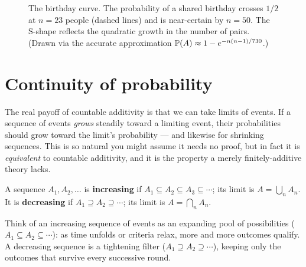\begin{figure}[H]
\centering
{}
\caption{The birthday curve. The probability of a shared birthday crosses $1/2$
at $n=23$ people (dashed lines) and is near-certain by $n=50$. The S-shape
reflects the quadratic growth in the number of pairs. (Drawn via the accurate
approximation $\P(A)\approx 1-e^{-n(n-1)/730}$.)}
\label{ch03:fig-birthday}
\end{figure}

\section{Continuity of probability}
\label{ch03:continuity}

The real payoff of countable additivity is that we can take limits of events. If a sequence of events \emph{grows} steadily toward
a limiting event, their probabilities should grow toward the limit's probability
--- and likewise for shrinking sequences. This is so natural you might assume it
needs no proof, but in fact it is \emph{equivalent} to countable additivity, and
it is the property a merely finitely-additive theory lacks.

\begin{definition}
\label{ch03:def-mono-seq}
A sequence $A_1, A_2, \dots$ is \textbf{increasing} if $A_1 \subseteq A_2
\subseteq A_3 \subseteq \cdots$; its limit is $A = \bigcup_{n} A_n$. It is
\textbf{decreasing} if $A_1 \supseteq A_2 \supseteq \cdots$; its limit is
$A = \bigcap_{n} A_n$.
\end{definition}

Think of an increasing sequence of events as an expanding pool of possibilities
($A_1 \subseteq A_2 \subseteq \cdots$): as time unfolds or criteria relax, more
and more outcomes qualify. A decreasing sequence is a tightening filter
($A_1 \supseteq A_2 \supseteq \cdots$), keeping only the outcomes that survive
every successive round.

